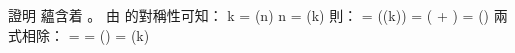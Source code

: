 \startEXERCISE
證明  蘊含着 。
\stopEXERCISE
\startANSWER
由 \m{\Theta} 的對稱性可知：
\startformula
k = \Theta(n) \Rightarrow n = \Theta(k)
\stopformula
則：
\startformula
{} = \Theta(\ln(k)) = \Theta( + \ln{}) = \Theta()
\stopformula
兩式相除：
\startformula
{}
  = 
  = \Theta()
  = \Theta(k)
\stopformula
\stopANSWER

\stopsection
